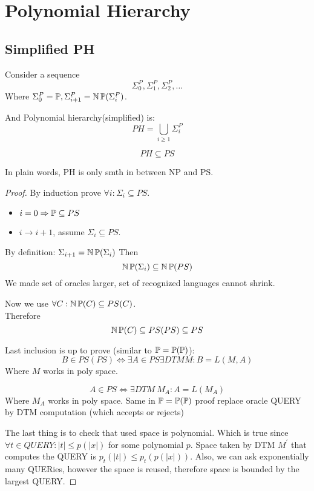 \section{\texorpdfstring{Polynomial Hierarchy}{Polynomial Hierarchy}}
\vspace{5mm}
\large

\subsection{Simplified PH}

\begin{definition}[Simplified PH]
	Consider a sequence
	\[ \Sigma_0^P, \Sigma_1^P, \Sigma_2^P, \ldots \]
	Where $\Sigma_0^P = \operatorname{\mathbb{P}}, \Sigma_{i + 1}^P = \operatorname{\operatorname{\mathbb{N}}\mathbb{P}}(\Sigma_i^P)$.

	And Polynomial hierarchy(simplified) is:
	\[ PH = \bigcup_{i \geq 1} \Sigma_i^P \]
\end{definition}

\begin{theorem}
	\[ PH \subseteq PS \]

	In plain words, PH is only smth in between NP and PS.
\end{theorem}
\begin{proof}
	By induction prove $\forall i: \Sigma_i \subseteq PS$.

	\begin{itemize}
		\item $i = 0 \Rightarrow \operatorname{\mathbb{P}} \subseteq PS$
		\item $i \to i + 1$, assume $\Sigma_i \subseteq PS$.
	\end{itemize}

	By definition: $\Sigma_{i + 1} = \operatorname{\operatorname{\mathbb{N}}\mathbb{P}}(\Sigma_i)$
	Then
	\[ \operatorname{\operatorname{\mathbb{N}}\mathbb{P}}(\Sigma_i) \subseteq \operatorname{\operatorname{\mathbb{N}}\mathbb{P}}(PS) \]
	We made set of oracles larger, set of recognized languages cannot shrink.

	Now we use $\forall C: \operatorname{\operatorname{\mathbb{N}}\mathbb{P}}(C) \subseteq PS(C)$.\\
	Therefore
	\[ \operatorname{\operatorname{\mathbb{N}}\mathbb{P}}(C) \subseteq PS(PS) \subseteq PS \]

	Last inclusion is up to prove (similar to $\operatorname{\mathbb{P}} = \operatorname{\mathbb{P}}(\operatorname{\mathbb{P}})$):\\
	\[ B \in PS(PS) \iff \exists A \in PS \exists DTM M: B = L(M, A) \]
	Where $M$ works in poly space.

	\[ A \in PS \iff \exists DTM \ M_A: A = L(M_A) \]
	Where $M_A$ works in poly space.
	Same in $\operatorname{\mathbb{P}} = \operatorname{\mathbb{P}}(\operatorname{\mathbb{P}})$ proof replace oracle QUERY by DTM computation (which accepts or rejects)

	The last thing is to check that used space is polynomial.
	Which is true since $\forall t \in QUERY: |t| \leq p(|x|)$ for some polynomial $p$.
	Space taken by DTM $M^{\prime}$ that computes the QUERY is $p_t(|t|) \leq p_t(p(|x|))$.
	Also, we can ask exponentially many QUERies, however the space is reused, therefore space is bounded by the largest QUERY.
\end{proof}

